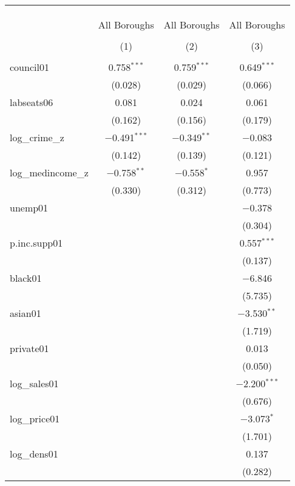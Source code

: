 
\begin{table}[!htbp] \centering 
  \caption{} 
  \label{} 
\begin{tabular}{@{\extracolsep{5pt}}lccc} 
\\[-1.8ex]\hline \\[-1.8ex] 
\\[-1.8ex] & \multicolumn{3}{c}{} \\ 
 & All Boroughs & All Boroughs & All Boroughs \\ 
\\[-1.8ex] & (1) & (2) & (3)\\ 
\hline \\[-1.8ex] 
 council01 & 0.758$^{***}$ & 0.759$^{***}$ & 0.649$^{***}$ \\ 
  & (0.028) & (0.029) & (0.066) \\ 
  labseats06 & 0.081 & 0.024 & 0.061 \\ 
  & (0.162) & (0.156) & (0.179) \\ 
  log\_crime\_z & $-$0.491$^{***}$ & $-$0.349$^{**}$ & $-$0.083 \\ 
  & (0.142) & (0.139) & (0.121) \\ 
  log\_medincome\_z & $-$0.758$^{**}$ & $-$0.558$^{*}$ & 0.957 \\ 
  & (0.330) & (0.312) & (0.773) \\ 
  unemp01 &  &  & $-$0.378 \\ 
  &  &  & (0.304) \\ 
  p.inc.supp01 &  &  & 0.557$^{***}$ \\ 
  &  &  & (0.137) \\ 
  black01 &  &  & $-$6.846 \\ 
  &  &  & (5.735) \\ 
  asian01 &  &  & $-$3.530$^{**}$ \\ 
  &  &  & (1.719) \\ 
  private01 &  &  & 0.013 \\ 
  &  &  & (0.050) \\ 
  log\_sales01 &  &  & $-$2.200$^{***}$ \\ 
  &  &  & (0.676) \\ 
  log\_price01 &  &  & $-$3.073$^{*}$ \\ 
  &  &  & (1.701) \\ 
  log\_dens01 &  &  & 0.137 \\ 
  &  &  & (0.282) \\ 

\end{tabular}
\end{table}
